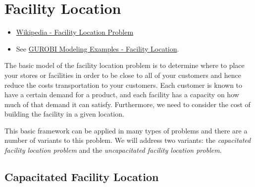 \section{Facility Location}
\begin{resource}{}{}
\begin{itemize}
\item \href{https://en.wikipedia.org/wiki/Facility_location_problem}{Wikipedia - Facility Location Problem}
\item See \href{https://github.com/Gurobi/modeling-examples/tree/master/facility_location}{GUROBI Modeling Examples - Facility Location}.
\end{itemize}
\end{resource}
The basic model of the facility location problem is to determine where to place your stores or facilities in order to be close to all of your customers and hence reduce the costs transportation to your customers.  Each customer is known to have a certain demand for a product, and each facility has a capacity on how much of that demand it can satisfy.  Furthermore, we need to consider the cost of building the facility in a given location.

This basic framework can be applied in many types of problems and there are a number of variants to this problem.   We will address two variants: the \emph{capacitated facility location problem} and the \emph{uncapacitated facility location problem}.  



\subsection{Capacitated Facility Location}

